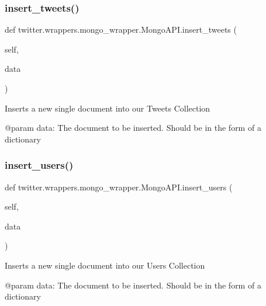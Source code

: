 \subsubsection{\texorpdfstring{insert\+\_\+tweets()}{insert\_tweets()}}
{\footnotesize\ttfamily def twitter.\+wrappers.\+mongo\+\_\+wrapper.\+Mongo\+A\+P\+I.\+insert\+\_\+tweets (\begin{DoxyParamCaption}\item[{}]{self,  }\item[{}]{data }\end{DoxyParamCaption})}

\begin{DoxyVerb}Inserts a new single document into our Tweets Collection

@param data: The document to be inserted. Should be in the form of a dictionary
\end{DoxyVerb}
 \mbox{\label{classtwitter_1_1wrappers_1_1mongo__wrapper_1_1MongoAPI_a3f6edee30773ed114e48e32d54d45574}} 
\subsubsection{\texorpdfstring{insert\+\_\+users()}{insert\_users()}}
{\footnotesize\ttfamily def twitter.\+wrappers.\+mongo\+\_\+wrapper.\+Mongo\+A\+P\+I.\+insert\+\_\+users (\begin{DoxyParamCaption}\item[{}]{self,  }\item[{}]{data }\end{DoxyParamCaption})}

\begin{DoxyVerb}Inserts a new single document into our Users Collection

@param data: The document to be inserted. Should be in the form of a dictionary
\end{DoxyVerb}
 \mbox{\label{classtwitter_1_1wrappers_1_1mongo__wrapper_1_1MongoAPI_a6c5e6f8615e5795faffe3126b413dc05}} 
